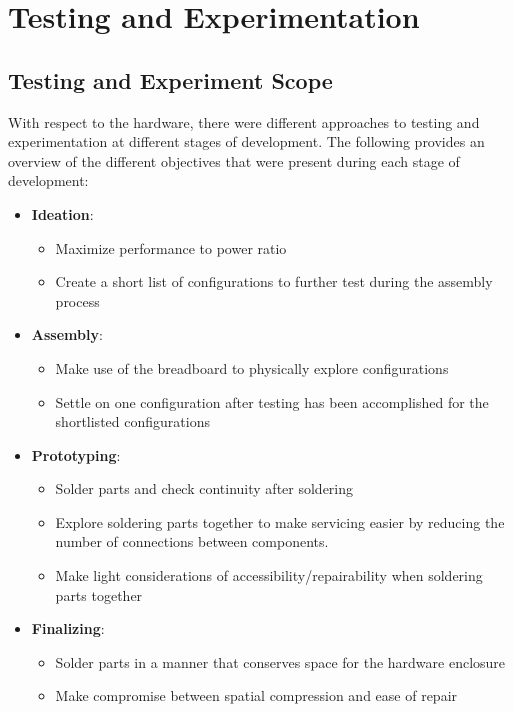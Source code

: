 \section{Testing and Experimentation}\label{sec:testing-and-experimentation}

\subsection{Testing and Experiment Scope}\label{subsec:testing-and-experiment-scope}

With respect to the hardware, there were different approaches
to testing and experimentation
at different stages of development.
The following provides an overview of the different objectives that were present during each stage of development:

\begin{itemize}
    \item \textbf{Ideation}:
          \begin{itemize}
              \item Maximize performance to power ratio
              \item Create a short list of configurations to further test
                    during the assembly process
          \end{itemize}
    \item \textbf{Assembly}:
          \begin{itemize}
              \item Make use of the breadboard to physically explore configurations
              \item Settle on one configuration after testing has been
                    accomplished for the shortlisted configurations
          \end{itemize}
    \item \textbf{Prototyping}:
          \begin{itemize}
              \item Solder parts and check continuity after soldering
              \item Explore soldering parts together to make servicing easier
                    by reducing the number of connections between components.
              \item Make light considerations of accessibility/repairability when soldering parts together
          \end{itemize}
    \item \textbf{Finalizing}:
          \begin{itemize}
              \item Solder parts in a manner that conserves space for the hardware enclosure
              \item Make compromise between spatial compression and ease of repair
          \end{itemize}
\end{itemize}

